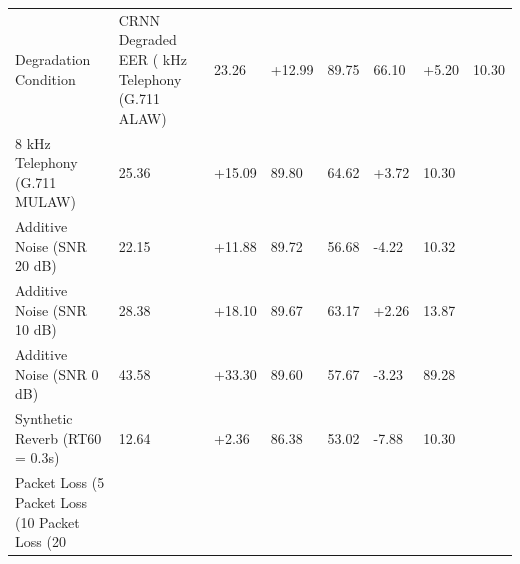 \begin{tabular}{lllllll}
\toprule
Degradation Condition & CRNN Degraded EER (%
 kHz Telephony (G.711 ALAW) & 23.26 & +12.99 & 89.75 & 66.10 & +5.20 & 10.30 \\
8 kHz Telephony (G.711 MULAW) & 25.36 & +15.09 & 89.80 & 64.62 & +3.72 & 10.30 \\
Additive Noise (SNR 20 dB) & 22.15 & +11.88 & 89.72 & 56.68 & -4.22 & 10.32 \\
Additive Noise (SNR 10 dB) & 28.38 & +18.10 & 89.67 & 63.17 & +2.26 & 13.87 \\
Additive Noise (SNR 0 dB) & 43.58 & +33.30 & 89.60 & 57.67 & -3.23 & 89.28 \\
Synthetic Reverb (RT60 = 0.3s) & 12.64 & +2.36 & 86.38 & 53.02 & -7.88 & 10.30 \\
Packet Loss (5%
Packet Loss (10%
Packet Loss (20%
\bottomrule
\end{tabular}
